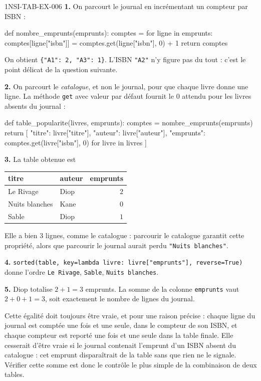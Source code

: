 \begin{corrige}{1NSI-TAB-EX-006}
\textbf{1.} On parcourt le journal en incrémentant un compteur par ISBN :
\begin{python}
def nombre_emprunts(emprunts):
    comptes = {}
    for ligne in emprunts:
        comptes[ligne["isbn"]] = comptes.get(ligne["isbn"], 0) + 1
    return comptes
\end{python}
On obtient \lstinline!{"A1": 2, "A3": 1}!. L'ISBN \lstinline{"A2"} n'y figure
pas du tout : c'est le point délicat de la question suivante.

\textbf{2.} On parcourt le \emph{catalogue}, et non le journal, pour que chaque
livre donne une ligne. La méthode \lstinline{get} avec valeur par défaut fournit
le $0$ attendu pour les livres absents du journal :
\begin{python}
def table_popularite(livres, emprunts):
    comptes = nombre_emprunts(emprunts)
    return [
        {"titre": livre["titre"], "auteur": livre["auteur"],
         "emprunts": comptes.get(livre["isbn"], 0)}
        for livre in livres
    ]
\end{python}

\textbf{3.} La table obtenue est

\begin{center}
\begin{tabular}{llr}
\hline
titre & auteur & emprunts \\
\hline
Le Rivage & Diop & $2$ \\
Nuits blanches & Kane & $0$ \\
Sable & Diop & $1$ \\
\hline
\end{tabular}
\end{center}

Elle a bien $3$ lignes, comme le catalogue : parcourir le catalogue garantit
cette propriété, alors que parcourir le journal aurait perdu
\lstinline{"Nuits blanches"}.

\textbf{4.} \lstinline{sorted(table, key=lambda livre: livre["emprunts"], reverse=True)}
donne l'ordre \lstinline{Le Rivage}, \lstinline{Sable},
\lstinline{Nuits blanches}.

\textbf{5.} Diop totalise $2+1=3$ emprunts. La somme de la colonne
\lstinline{emprunts} vaut $2+0+1=3$, soit exactement le nombre de lignes du
journal.

Cette égalité doit toujours être vraie, et pour une raison précise : chaque
ligne du journal est comptée une fois et une seule, dans le compteur de son
ISBN, et chaque compteur est reporté une fois et une seule dans la table
finale. Elle cesserait d'être vraie si le journal contenait l'emprunt d'un ISBN
absent du catalogue : cet emprunt disparaîtrait de la table sans que rien ne le
signale. Vérifier cette somme est donc le contrôle le plus simple de la
combinaison de deux tables.
\end{corrige}
